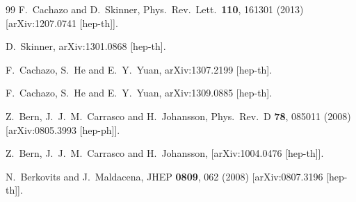 \documentclass[12pt,nohyper,twosided]{JHEP3}
\begin{document}
\begin{thebibliography}{99}
  F.~Cachazo and D.~Skinner,
  Phys.\ Rev.\ Lett.\  {\bf 110}, 161301 (2013)
  [arXiv:1207.0741 [hep-th]].

  D.~Skinner,
  arXiv:1301.0868 [hep-th].

  F.~Cachazo, S.~He and E.~Y.~Yuan,
  arXiv:1307.2199 [hep-th].

  F.~Cachazo, S.~He and E.~Y.~Yuan,
  arXiv:1309.0885 [hep-th].

  Z.~Bern, J.~J.~M.~Carrasco and H.~Johansson,
  Phys.\ Rev.\ D {\bf 78}, 085011 (2008)
  [arXiv:0805.3993 [hep-ph]].

  Z.~Bern, J.~J.~M.~Carrasco and H.~Johansson,
  [arXiv:1004.0476 [hep-th]].

  N.~Berkovits and J.~Maldacena,
  JHEP {\bf 0809}, 062 (2008)
  [arXiv:0807.3196 [hep-th]].


\end{thebibliography}
\end{document}
